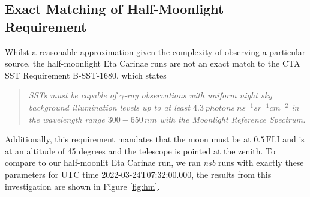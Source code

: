 \subsection{Exact Matching of Half-Moonlight Requirement}
Whilst a reasonable approximation given the complexity of observing a particular source, the half-moonlight Eta Carinae runs are not an exact match to the CTA SST Requirement B-SST-1680, which states
\begin{quote}
    \textit{SSTs must be capable of $\gamma$-ray observations with uniform night sky background illumination levels up to at least $\mathit{4.3}\ photons\ ns^{-1} sr^{-1} cm^{-2}$ in the wavelength range $\mathit{300-650}\,nm$ with the Moonlight Reference Spectrum.}
\end{quote}
Additionally, this requirement mandates that the moon must be at $\mathrm{0.5\,FLI}$ and is at an altitude of 45 degrees and the telescope is pointed at the zenith. To compare to our half-moonlit Eta Carinae run, we ran \textit{nsb} runs with exactly these parameters for UTC time 2022-03-24T07:32:00.000, the results from this investigation are shown in Figure \ref{fig:hm}.

